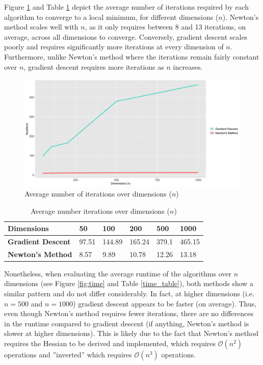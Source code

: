 \documentclass[12pt, authoryear]{elsarticle}
\begin{document}
Figure \ref{fig:dimensions} and Table \ref{dim_table} depict the average number of iterations required by each algorithm to converge to a local minimum, for different dimensions ($n$). Newton's method scales well with $n$, as it only requires between 8 and 13 iterations, on average, across all dimensions to converge. Conversely, gradient descent scales poorly and requires significantly more iterations at every dimension of $n$. Furthermore, unlike Newton's method where the iterations remain fairly constant over $n$, gradient descent requires more iterations as $n$ increases.  

\begin{figure}[H]
	\centering
	\includegraphics[clip, angle=0, width=13cm]{images/dimensions.png}
	\caption{Average number of iterations over dimensions ($n$)}
	\label{fig:dimensions}
\end{figure}

\begin{table}[H]
	\centering
	\caption{Average number iterations over dimensions ($n$)}
	\label{dim_table}
	\begin{tabular}{llllll} \hline 
		\textbf{Dimensions} \cellcolor{gray!25} & \textbf{50} \cellcolor{gray!25} & \textbf{100} \cellcolor{gray!25} & \textbf{200} \cellcolor{gray!25} & \textbf{500} \cellcolor{gray!25} & \textbf{1000} \cellcolor{gray!25}  \\ \hline
		\textbf{Gradient Descent}  & 97.51 & 144.89 & 165.24 & 379.1 & 465.15 \\ \hline
		\textbf{Newton's Method} & 8.57 & 9.89 & 10.78 & 12.26 & 13.18 \\ \hline
	\end{tabular}
\end{table}

Nonetheless, when evaluating the average runtime of the algorithms over $n$ dimensions (see Figure \ref{fig:time} and Table \ref{time_table}), both methods show a similar pattern and do not differ considerably. In fact, at higher dimensions (i.e. $n = 500$ and $n = 1000$) gradient descent appears to be faster (on average). Thus, even though Newton's method requires fewer iterations, there are no differences in the runtime compared to gradient descent (if anything, Newton's method is slower at higher dimensions). This is likely due to the fact that Newton's method requires the Hessian to be derived and implemented, which requires $\mathcal{O}(n^2)$ operations and ”inverted” which requires $\mathcal{O}(n^3)$ operations. 
\end{document}
